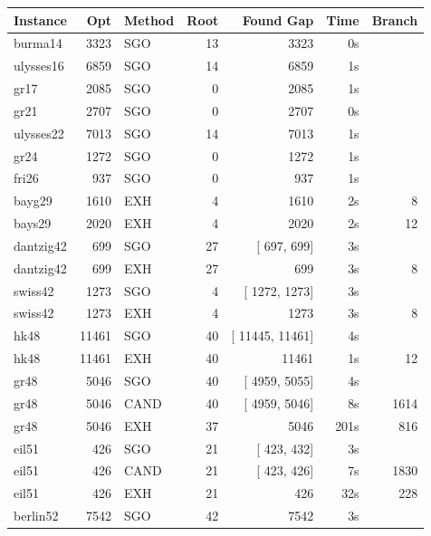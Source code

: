 \documentclass[a4paper,11pt,twoside]{book}
\begin{document}
\begin{multicols}{2}
\vfill
\begin{center}
\small
\begin{tabular}{|lrlrrrr|}
\hline
{\bf Instance} & {\bf Opt} & {\bf Method} & {\bf Root} & {\bf Found Gap} & {\bf Time} & {\bf Branch} \\
\hline
\hline
burma14      &     3323 &  SGO &  13 &           3323  &     0s & \\
ulysses16    &     6859 &  SGO &  14 &           6859  &     1s & \\
gr17         &     2085 &  SGO &   0 &           2085  &     1s & \\
gr21         &     2707 &  SGO &   0 &           2707  &     0s & \\
ulysses22    &     7013 &  SGO &  14 &           7013  &     1s & \\
gr24         &     1272 &  SGO &   0 &           1272  &     1s & \\
fri26        &      937 &  SGO &   0 &            937  &     1s & \\
bayg29       &     1610 &  EXH &   4 &           1610  &     2s &       8 \\
bays29       &     2020 &  EXH &   4 &           2020  &     2s &      12 \\
dantzig42    &      699 &  SGO &  27 & [   697,   699] &     3s & \\
dantzig42    &      699 &  EXH &  27 &            699  &     3s &       8 \\
swiss42      &     1273 &  SGO &   4 & [  1272,  1273] &     3s & \\
swiss42      &     1273 &  EXH &   4 &           1273  &     3s &       8 \\
hk48         &    11461 &  SGO &  40 & [ 11445, 11461] &     4s & \\
hk48         &    11461 &  EXH &  40 &          11461  &     1s &      12 \\
gr48         &     5046 &  SGO &  40 & [  4959,  5055] &     4s & \\
gr48         &     5046 & CAND &  40 & [  4959,  5046] &     8s &    1614 \\
gr48         &     5046 &  EXH &  37 &           5046  &   201s &     816 \\
eil51        &      426 &  SGO &  21 & [   423,   432] &     3s & \\
eil51        &      426 & CAND &  21 & [   423,   426] &     7s &    1830 \\
eil51        &      426 &  EXH &  21 &            426  &    32s &     228 \\
berlin52     &     7542 &  SGO &  42 &           7542  &     3s & \\
\hline
\end{tabular}
\end{center}



\end{multicols}
\end{document}
